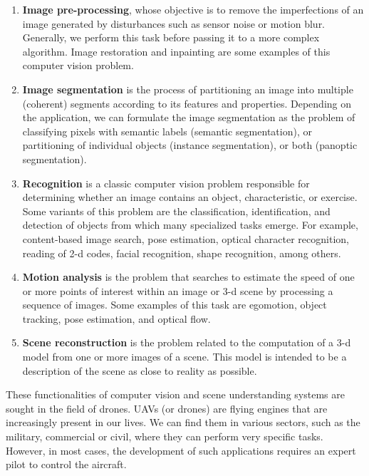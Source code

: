 \begin{enumerate}[label=\roman*]
	\item \textbf{Image pre-processing}, whose objective is to remove the imperfections of an image generated by disturbances such as sensor noise or motion blur. Generally, we perform this task before passing it to a more complex algorithm. Image restoration and inpainting are some examples of this computer vision problem.
	
	\item \textbf{Image segmentation} is the process of partitioning an image into multiple (coherent) segments according to its features and properties. Depending on the application, we can formulate the image segmentation as the problem of classifying pixels with semantic labels (semantic segmentation), or partitioning of individual objects (instance segmentation), or both (panoptic segmentation).
	
	\item \textbf{Recognition} is a classic computer vision problem responsible for determining whether an image contains an object, characteristic, or exercise. Some variants of this problem are the classification, identification, and detection of objects from which many specialized tasks emerge. For example, content-based image search, pose estimation, optical character recognition, reading of 2-d codes, facial recognition, shape recognition, among others.
	
	\item \textbf{Motion analysis} is the problem that searches to estimate the speed of one or more points of interest within an image or 3-d scene by processing a sequence of images. Some examples of this task are egomotion, object tracking, pose estimation, and optical flow.
	
	\item \textbf{Scene reconstruction} is the problem related to the computation of a 3-d model from one or more images of a scene. This model is intended to be a description of the scene as close to reality as possible. 	
\end{enumerate}

These functionalities of computer vision and scene understanding systems are sought in the field of drones. UAVs (or drones) are flying engines that are increasingly present in our lives. We can find them in various sectors, such as the military, commercial or civil, where they can perform very specific tasks. However, in most cases, the development of such applications requires an expert pilot to control the aircraft. 

